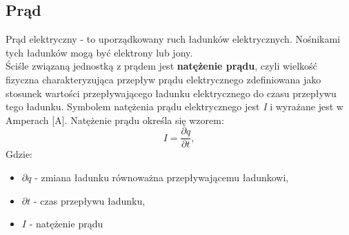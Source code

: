 \documentclass[12pt]{article}
\begin{document}
\subsection{Prąd}
Prąd elektryczny - to uporządkowany ruch ładunków elektrycznych. Nośnikami tych ładunków mogą być elektrony lub jony.\\
Ściśle związaną jednostką z prądem jest \textbf{natężenie prądu}, czyli wielkość fizyczna charakteryzująca przepływ prądu elektrycznego zdefiniowana jako stosunek wartości przepływającego ładunku elektrycznego do czasu przepływu tego ładunku.
Symbolem natężenia prądu elektrycznego jest \textit{I} i wyrażane jest w Amperach [A]. Natężenie prądu określa się wzorem:
\begin{equation}
    I = \frac{\partial{q}}{\partial{t}},
\end{equation}
Gdzie:
    \begin{itemize}
        \item $\partial{q}$ - zmiana ładunku równoważna przepływającemu ładunkowi,
        \item $\partial{t}$ - czas przepływu ładunku,
        \item $I$ - natężenie prądu
    \end{itemize}
\end{document}
